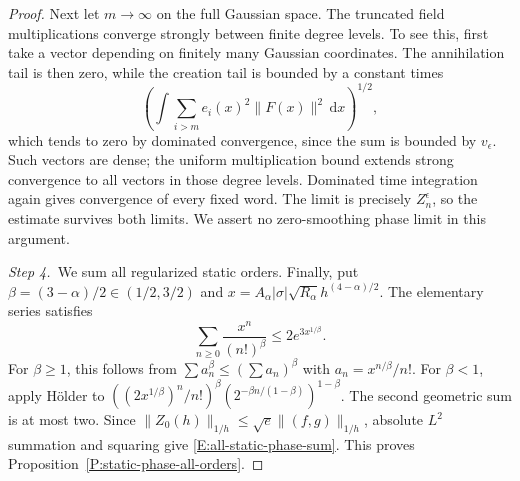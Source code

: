 \documentclass[12pt,oneside,openany]{book}
\numberwithin{equation}{section}
\theoremstyle{nogostyle}
\theoremstyle{definition}
\newcommand{\ud}{\,\mathrm{d}}
\begin{document}
\begin{proof}
  Next let $m \to \infty$ on the full Gaussian space. The truncated field
  multiplications converge strongly between finite degree levels. To see this,
  first take a vector depending on finitely many Gaussian coordinates. The
  annihilation tail is then zero, while the creation tail is bounded by a
  constant times
  \[
    \left(\int\sum_{i>m}e_i(x)^2\|F(x)\|^2\ud x\right)^{1/2},
  \]
  which tends to zero by dominated convergence, since the sum is bounded by
  $v_\epsilon$. Such vectors are dense; the uniform multiplication bound extends
  strong convergence to all vectors in those degree levels. Dominated time
  integration again gives convergence of every fixed word. The limit is
  precisely $Z_n^\epsilon$, so the estimate survives both limits. We assert no
  zero-smoothing phase limit in this argument.


  \medskip
  \noindent\textit{Step 4.~}We sum all regularized static orders.
  Finally, put $\beta = (3-\alpha)/2 \in (1/2,3/2)$ and $x =
  A_\alpha|\sigma|\sqrt{R_\alpha}h^{(4-\alpha)/2}$. The elementary series
  satisfies
  \[
    \sum_{n\ge0}\frac{x^n}{(n!)^\beta}
    \le2e^{3x^{1/\beta}}.
  \]
  For $\beta \ge 1$, this follows from $\sum a_n^\beta \le (\sum a_n)^\beta$
  with $a_n = x^{n/\beta}/n!$. For $\beta < 1$, apply H\"older to
  $((2x^{1/\beta})^n/n!)^\beta (2^{-\beta n/(1-\beta)})^{1-\beta}$. The second
  geometric sum is at most two. Since $\|Z_0(h)\|_{1/h} \le \sqrt
  e\|(f,g)\|_{1/h}$, absolute $L^2$ summation and squaring give
  \eqref{E:all-static-phase-sum}. This proves
  Proposition~\ref{P:static-phase-all-orders}.
\end{proof}


\end{document}
